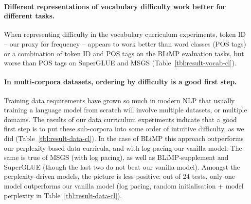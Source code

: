 \paragraph{Different representations of vocabulary difficulty work better for different tasks.}
When representing difficulty in the vocabulary curriculum experiments, token ID -- our proxy for frequency -- appears to work better than word classes (POS tags) or a combination of token ID and POS tags on the BLiMP evaluation tasks, but worse than POS tags on SuperGLUE and MSGS (Table~\ref{tbl:result-vocab-cl}).


\paragraph{In multi-corpora datasets, ordering by difficulty is a good first step.}
Training data requirements have grown so much in modern NLP that usually training a language model from scratch will involve multiple datasets, or multiple domains. The results of our data curriculum experiments indicate that a good first step is to put these sub-corpora into some order of intuitive difficulty, as we did (Table~\ref{tbl:result-data-cl}). In the case of BLiMP this approach outperforms our perplexity-based data curricula, and with log pacing our vanilla model. The same is true of MSGS  (with log pacing), as well as BLiMP-supplement and SuperGLUE (though the last two do not beat our vanilla model). 
Amongst the perplexity-driven models, the picture is less positive: out of 24 tests, only one model outperforms our vanilla model (log pacing, random initialisation + model perplexity in Table~\ref{tbl:result-data-cl}).



